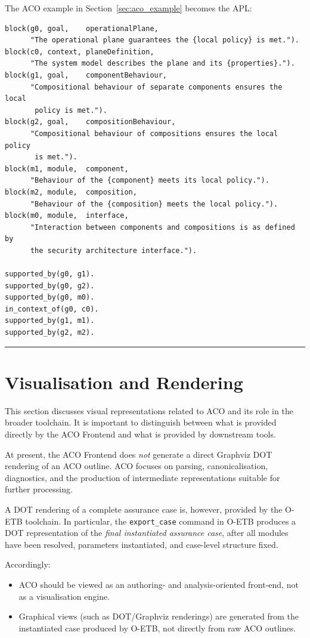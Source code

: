 \documentclass[11pt]{article}
\begin{document}
The ACO example in Section~\ref{sec:aco_example} becomes the APL:

\begin{verbatim}
block(g0, goal,    operationalPlane,
      "The operational plane guarantees the {local policy} is met.").
block(c0, context, planeDefinition,
      "The system model describes the plane and its {properties}.").
block(g1, goal,    componentBehaviour,
      "Compositional behaviour of separate components ensures the local
       policy is met.").
block(g2, goal,    compositionBehaviour,
      "Compositional behaviour of compositions ensures the local policy
       is met.").
block(m1, module,  component,
      "Behaviour of the {component} meets its local policy.").
block(m2, module,  composition,
      "Behaviour of the {composition} meets the local policy.").
block(m0, module,  interface,
      "Interaction between components and compositions is as defined by
      the security architecture interface.").

supported_by(g0, g1).
supported_by(g0, g2).
supported_by(g0, m0).
in_context_of(g0, c0).
supported_by(g1, m1).
supported_by(g2, m2).
\end{verbatim}

\bigskip
\hrule
\bigskip

\section{Visualisation and Rendering}

This section discusses visual representations related to ACO and its role in the
broader toolchain. It is important to distinguish between what is provided directly
by the ACO Frontend and what is provided by downstream tools.

At present, the ACO Frontend does \emph{not} generate a direct Graphviz DOT rendering
of an ACO outline. ACO focuses on parsing, canonicalisation, diagnostics, and the
production of intermediate representations suitable for further processing.

A DOT rendering of a complete assurance case is, however, provided by the O-ETB
toolchain. In particular, the \texttt{export\_case} command in O-ETB produces a DOT
representation of the \emph{final instantiated assurance case}, after all modules
have been resolved, parameters instantiated, and case-level structure fixed.

Accordingly:
\begin{itemize}[leftmargin=2em]
  \item ACO should be viewed as an authoring- and analysis-oriented front-end,
        not as a visualisation engine.
  \item Graphical views (such as DOT/Graphviz renderings) are generated from the
        instantiated case produced by O-ETB, not directly from raw ACO outlines.
\end{itemize}
\end{document}
